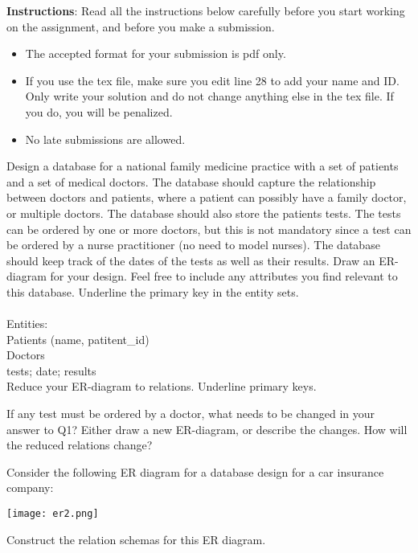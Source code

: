 \documentclass[a4 paper]{article}
\begin{document}
\textbf{Instructions}: Read all the instructions below carefully before you start working on the assignment, and before you make a submission.
\begin{itemize}
    \item The accepted format for your submission is pdf only.
    \item If you use the tex file, make sure you edit line 28 to add your name and ID. Only write your solution and do not change anything else in the tex file. If you do, you will be penalized.
    \item No late submissions are allowed.
\end{itemize}



Design a database for a national family medicine practice with a set of patients and a set of medical doctors. The database should capture the relationship between doctors and patients, where a patient can possibly have a family doctor, or multiple doctors. The database should also store the patients tests. The tests can be ordered by one or more doctors, but this is not mandatory since a test can be ordered by a nurse practitioner (no need to model nurses). The database should keep track of the dates of the tests as well as their results. Draw an ER-diagram for your design. Feel free to include any attributes you find relevant to this database. Underline the primary key in the entity sets.\\\\
Entities:\\
Patients (name, patitent\_id)\\
Doctors\\
tests; date; results\\



Reduce your ER-diagram to relations. Underline primary keys.



If any test must be ordered by a doctor, what needs to be changed in your answer to Q1? Either draw a new ER-diagram, or describe the changes. How will the reduced relations change?



Consider the following ER diagram for a database design for a car insurance company:

\texttt{[image: er2.png]}

\noindent Construct the relation schemas for this ER diagram.
\end{document}
